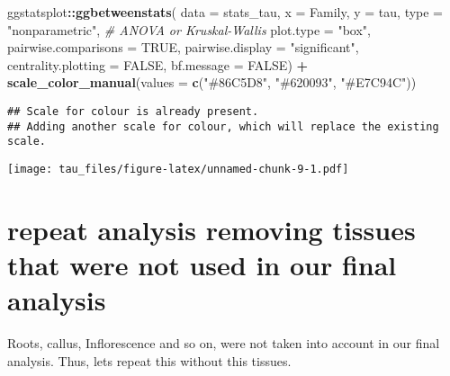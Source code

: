 \documentclass[
]{article}
\newenvironment{Shaded}{\begin{snugshade}}{\end{snugshade}}
\newcommand{\AttributeTok}[1]{\textcolor[rgb]{0.13,0.29,0.53}{#1}}
\newcommand{\CommentTok}[1]{\textcolor[rgb]{0.56,0.35,0.01}{\textit{#1}}}
\newcommand{\ConstantTok}[1]{\textcolor[rgb]{0.56,0.35,0.01}{#1}}
\newcommand{\FunctionTok}[1]{\textcolor[rgb]{0.13,0.29,0.53}{\textbf{#1}}}
\newcommand{\NormalTok}[1]{#1}
\newcommand{\SpecialCharTok}[1]{\textcolor[rgb]{0.81,0.36,0.00}{\textbf{#1}}}
\newcommand{\StringTok}[1]{\textcolor[rgb]{0.31,0.60,0.02}{#1}}
\begin{document}
\begin{Shaded}
\begin{Highlighting}[]
\NormalTok{ggstatsplot}\SpecialCharTok{::}\FunctionTok{ggbetweenstats}\NormalTok{(}
  \AttributeTok{data =}\NormalTok{ stats\_tau,}
  \AttributeTok{x =}\NormalTok{ Family,}
  \AttributeTok{y =}\NormalTok{ tau,}
  \AttributeTok{type =} \StringTok{"nonparametric"}\NormalTok{, }\CommentTok{\# ANOVA or Kruskal{-}Wallis}
  \AttributeTok{plot.type =} \StringTok{"box"}\NormalTok{,}
  \AttributeTok{pairwise.comparisons =} \ConstantTok{TRUE}\NormalTok{,}
  \AttributeTok{pairwise.display =} \StringTok{"significant"}\NormalTok{,}
  \AttributeTok{centrality.plotting =} \ConstantTok{FALSE}\NormalTok{,}
  \AttributeTok{bf.message =} \ConstantTok{FALSE}\NormalTok{) }\SpecialCharTok{+}
  \FunctionTok{scale\_color\_manual}\NormalTok{(}\AttributeTok{values =} 
                      \FunctionTok{c}\NormalTok{(}\StringTok{"\#86C5D8"}\NormalTok{, }\StringTok{"\#620093"}\NormalTok{, }\StringTok{"\#E7C94C"}\NormalTok{))}
\end{Highlighting}
\end{Shaded}

\begin{verbatim}
## Scale for colour is already present.
## Adding another scale for colour, which will replace the existing scale.
\end{verbatim}

\texttt{[image: tau\_files/figure-latex/unnamed-chunk-9-1.pdf]}

\hypertarget{repeat-analysis-removing-tissues-that-were-not-used-in-our-final-analysis}{%
\section{repeat analysis removing tissues that were not used in our
final
analysis}\label{repeat-analysis-removing-tissues-that-were-not-used-in-our-final-analysis}}

Roots, callus, Inflorescence and so on, were not taken into account in
our final analysis. Thus, lets repeat this without this tissues.
\end{document}
